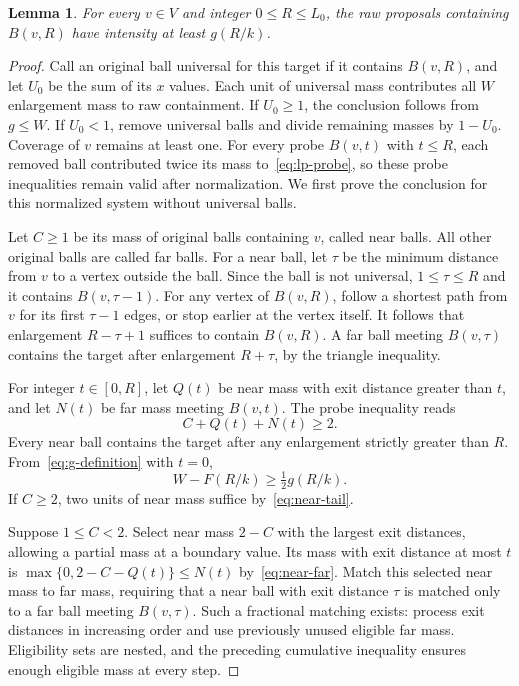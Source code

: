\documentclass[11pt]{article}
\numberwithin{equation}{section}
\newtheorem{lemma}[theorem]{Lemma}
\theoremstyle{definition}
\begin{document}
\begin{lemma}\label{lem:absorption}
For every $v\in V$ and integer $0\le R\le L_0$, the raw proposals
containing $B(v,R)$ have intensity at least $g(R/k)$.
\end{lemma}
\begin{proof}
Call an original ball universal for this target if it contains $B(v,R)$,
and let $U_0$ be the sum of its $x$ values. Each unit of universal mass
contributes all $W$ enlargement mass to raw containment. If $U_0\ge1$,
the conclusion follows from $g\le W$. If $U_0<1$, remove universal
balls and divide remaining masses by $1-U_0$. Coverage of $v$ remains
at least one. For every probe $B(v,t)$ with $t\le R$, each removed ball
contributed twice its mass to~\eqref{eq:lp-probe}, so these probe
inequalities remain valid after normalization. We first prove the
conclusion for this normalized system without universal balls.

Let $C\ge1$ be its mass of original balls containing $v$, called near
balls. All other original balls are called far balls. For a near ball,
let $\tau$ be the minimum distance from $v$ to a vertex outside the ball.
Since the ball is not universal, $1\le\tau\le R$ and it contains
$B(v,\tau-1)$. For any vertex of $B(v,R)$, follow a shortest path from
$v$ for its first $\tau-1$ edges, or stop earlier at the vertex itself.
It follows that enlargement $R-\tau+1$ suffices to contain $B(v,R)$.
A far ball meeting $B(v,\tau)$ contains the target after enlargement
$R+\tau$, by the triangle inequality.

For integer $t\in[0,R]$, let $Q(t)$ be near mass with exit distance
greater than $t$, and let $N(t)$ be far mass meeting $B(v,t)$. The probe
inequality reads
\begin{equation}\label{eq:near-far}
 C+Q(t)+N(t)\ge2.
\end{equation}
Every near ball contains the target after any enlargement strictly
greater than $R$. From~\eqref{eq:g-definition} with $t=0$,
\begin{equation}\label{eq:near-tail}
 W-F(R/k)\ge\tfrac12g(R/k).
\end{equation}
If $C\ge2$, two units of near mass suffice by~\eqref{eq:near-tail}.

Suppose $1\le C<2$. Select near mass $2-C$ with the largest exit
distances, allowing a partial mass at a boundary value. Its mass with
exit distance at most $t$ is
$\max\{0,2-C-Q(t)\}\le N(t)$ by~\eqref{eq:near-far}.
Match this selected near mass to far mass, requiring that a near ball
with exit distance $\tau$ is matched only to a far ball meeting
$B(v,\tau)$. Such a fractional matching exists: process exit distances
in increasing order and use previously unused eligible far mass.
Eligibility sets are nested, and the preceding cumulative inequality
ensures enough eligible mass at every step.


\end{proof}
\end{document}

